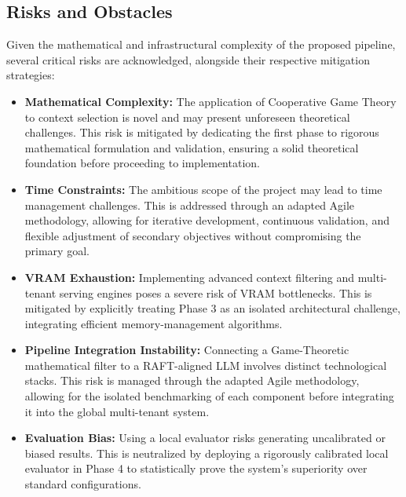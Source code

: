 \subsection{Risks and Obstacles}
\label{subsec:risks-and-obstacles}

Given the mathematical and infrastructural complexity of the proposed pipeline, several critical risks are acknowledged, alongside their respective mitigation strategies:
\begin{itemize}
    \item \textbf{Mathematical Complexity:} The application of Cooperative Game Theory to context selection is novel and may present unforeseen theoretical challenges. This risk is mitigated by dedicating the first phase to rigorous mathematical formulation and validation, ensuring a solid theoretical foundation before proceeding to implementation.

    \item \textbf{Time Constraints:} The ambitious scope of the project may lead to time management challenges. This is addressed through an adapted Agile methodology, allowing for iterative development, continuous validation, and flexible adjustment of secondary objectives without compromising the primary goal.

    \item \textbf{VRAM Exhaustion:} Implementing advanced context filtering and multi-tenant serving engines poses a severe risk of VRAM bottlenecks. This is mitigated by explicitly treating Phase 3 as an isolated architectural challenge, integrating efficient memory-management algorithms.
    \item \textbf{Pipeline Integration Instability:} Connecting a Game-Theoretic mathematical filter to a RAFT-aligned LLM involves distinct technological stacks. This risk is managed through the adapted Agile methodology, allowing for the isolated benchmarking of each component before integrating it into the global multi-tenant system.
    \item \textbf{Evaluation Bias:} Using a local evaluator risks generating uncalibrated or biased results. This is neutralized by deploying a rigorously calibrated local evaluator in Phase 4 to statistically prove the system's superiority over standard configurations.
\end{itemize}